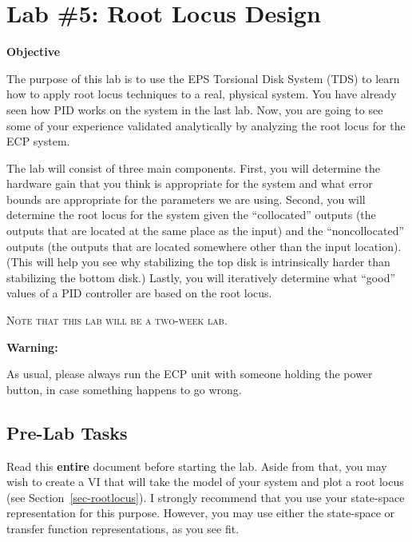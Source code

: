 \fancyhf{}
\fancyfoot[C]{\vspace{.2in}\thepage}

\chapter{Lab \#5:  Root Locus Design} 

\begin{center}  \textbf{Objective}
\end{center}

The purpose of this lab is to use the EPS Torsional Disk System (TDS) to learn
how to apply root locus techniques to a real, physical system.  You have already
seen how PID works on the system in the last lab.  Now, you are going to see
some of your experience validated analytically by analyzing the root locus for
the ECP system.

The lab will consist of three main components.  First, you will determine the
hardware gain that you think is appropriate for the system and what error bounds
are appropriate for the parameters we are using.  Second, you will determine the
root locus for the system given the ``collocated'' outputs (the outputs that are
located at the same place as the input) and the ``noncollocated'' outputs (the
outputs that are located somewhere other than the input location).  (This will
help you see why stabilizing the top disk is intrinsically harder than
stabilizing the bottom disk.)  Lastly, you will iteratively determine what
``good'' values of a PID controller are based on the root locus.


\vspace{.2in}

\begin{center} \textsc{Note that this lab will be a two-week lab.}
\end{center}

\begin{center} \textbf{Warning:} 
\end{center}

As usual, please always run the ECP unit with someone holding the power button,
in case something happens to go wrong.

\newpage
\section{Pre-Lab Tasks}

Read this \textbf{entire} document before starting the lab.  Aside from that, you may
wish to create a VI that will take the model of your system and plot a root
locus (see Section~\ref{sec-rootlocus}).  I strongly recommend that you use your
state-space representation for this purpose.  However, you may use either the
state-space or transfer function representations, as you see fit.

